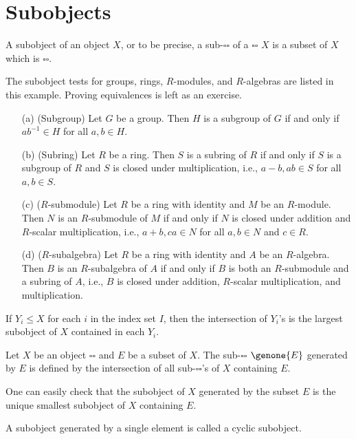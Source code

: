 \section{Subobjects}

A subobject of an object $X$, or to be precise, a sub-$\square\square$ of a $\square\square$ $X$ is a subset of $X$ which is $\square\square$.

\begin{exmp}
    The subobject tests for groups, rings, $R$-modules, and $R$-algebras are listed in this example.
    Proving equivalences is left as an exercise.
    \begin{enumerate}
        \item[(a)]
        {
            (Subgroup)
            Let $G$ be a group.
            Then $H$ is a subgroup of $G$ if and only if $ab^{-1}\in H$ for all $a, b\in H$.
        }
        \item[(b)]
        {
            (Subring)
            Let $R$ be a ring.
            Then $S$ is a subring of $R$ if and only if $S$ is a subgroup of $R$ and $S$ is closed under multiplication, i.e., $a-b, ab\in S$ for all $a, b\in S$.
        }
        \item[(c)]
        {
            ($R$-submodule)
            Let $R$ be a ring with identity and $M$ be an $R$-module.
            Then $N$ is an $R$-submodule of $M$ if and only if $N$ is closed under addition and $R$-scalar multiplication, i.e., $a+b, ca\in N$ for all $a, b\in N$ and $c\in R$.
        }
        \item[(d)]
        {
            ($R$-subalgebra)
            Let $R$ be a ring with identity and $A$ be an $R$-algebra.
            Then $B$ is an $R$-subalgebra of $A$ if and only if $B$ is both an $R$-submodule and a subring of $A$, i.e., $B$ is closed under addition, $R$-scalar multiplication, and multiplication.
        }
    \end{enumerate}
\end{exmp}

\begin{prop}
    If $Y_i\leq X$ for each $i$ in the index set $I$, then the intersection of $Y_i$'s is the largest subobject of $X$ contained in each $Y_i$.
\end{prop}

\begin{defi}
    Let $X$ be an object $\square\square$ and $E$ be a subset of $X$.
    The sub-$\square\square$ $\genone{E}$ generated by $E$ is defined by the intersection of all sub-$\square\square$'s of $X$ containing $E$.
\end{defi}
\begin{rmk}
    One can easily check that the subobject of $X$ generated by the subset $E$ is the unique smallest subobject of $X$ containing $E$.
\end{rmk}
A subobject generated by a single element is called a cyclic subobject.

